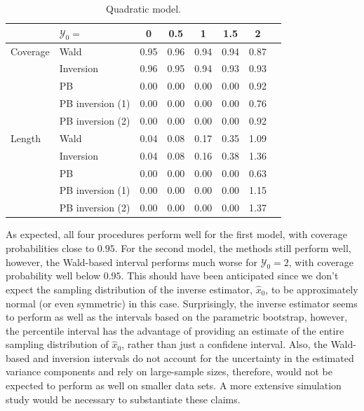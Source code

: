 \documentclass[cmfont,usenames,dvipsnames,leqno]{afit-etd}\usepackage[]{graphicx}\usepackage[]{color}
\begin{document}
\begin{table}[!htb]
\caption[Quadratic model]{Quadratic model. \label{tab:quadratic-results}}
\centering
  \begin{tabular}{llcccccc}
  \toprule
            &  $\mathcal{Y}_0 =$ & 0    & 0.5  & 1    & 1.5  & 2    \\
  \hline
  Coverage  &  Wald              & 0.95 & 0.96 & 0.94 & 0.94 & 0.87 \\
            &  Inversion         & 0.96 & 0.95 & 0.94 & 0.93 & 0.93 \\
            &  PB                & 0.00 & 0.00 & 0.00 & 0.00 & 0.92 \\
            &  PB inversion (1)  & 0.00 & 0.00 & 0.00 & 0.00 & 0.76 \\
						&  PB inversion (2)  & 0.00 & 0.00 & 0.00 & 0.00 & 0.92 \\
  \hline
  Length    &  Wald              & 0.04 & 0.08 & 0.17 & 0.35 & 1.09 \\
            &  Inversion         & 0.04 & 0.08 & 0.16 & 0.38 & 1.36 \\
            &  PB                & 0.00 & 0.00 & 0.00 & 0.00 & 0.63 \\
            &  PB inversion (1)  & 0.00 & 0.00 & 0.00 & 0.00 & 1.15 \\
						&  PB inversion (2)  & 0.00 & 0.00 & 0.00 & 0.00 & 1.37 \\
  \bottomrule
  \end{tabular}
\end{table}

As expected, all four procedures perform well for the first model, with coverage probabilities close to $0.95$. For the second model, the methods still perform well, however, the Wald-based interval performs much worse for $\mathcal{Y}_0 = 2$, with coverage probability well below $0.95$. This should have been anticipated since we don't expect the sampling distribution of the inverse estimator, $\widehat{x}_0$, to be approximately normal (or even symmetric) in this case. Surprisingly, the inverse estimator seems to perform as well as the intervals based on the parametric bootstrap, however, the percentile interval has the advantage of providing an estimate of the entire sampling distribution of $\widehat{x}_0$, rather than just a confidene interval. Also, the Wald-based and inversion intervals do not account for the uncertainty in the estimated variance components and rely on large-sample sizes, therefore, would not be expected to perform as well on smaller data sets. A more extensive simulation study would be necessary to substantiate these claims.
\end{document}
